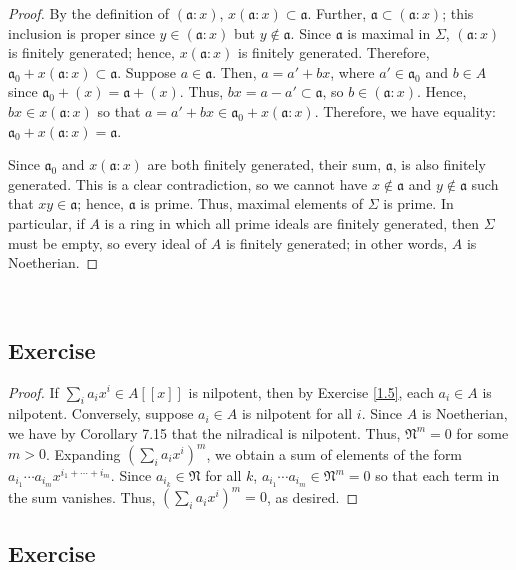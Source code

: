 \begin{proof}
By the definition of $(\mathfrak{a}:x)$, $x(\mathfrak{a}:x) \subset \mathfrak{a}$. Further, $\mathfrak{a} \subset (\mathfrak{a}:x)$; this inclusion is proper since $y \in (\mathfrak{a}:x)$ but
$y \not\in \mathfrak{a}$. Since $\mathfrak{a}$ is maximal in $\Sigma$, $(\mathfrak{a}:x)$ is finitely generated; hence, $x(\mathfrak{a}:x)$ is finitely generated. Therefore, 
$\mathfrak{a}_0 + x(\mathfrak{a}:x) \subset \mathfrak{a}$. Suppose $a \in \mathfrak{a}$. Then, $a = a' + bx$, where $a' \in \mathfrak{a}_0$ and $b \in A$ 
since $\mathfrak{a}_0 + (x) = \mathfrak{a} + (x)$. Thus, $bx = a - a' \subset \mathfrak{a}$, so $b \in (\mathfrak{a}:x)$. Hence, $bx \in x(\mathfrak{a}:x)$ so that 
$a = a' + bx \in \mathfrak{a}_0 + x(\mathfrak{a}:x)$. Therefore, we have equality: $\mathfrak{a}_0 + x(\mathfrak{a}:x) = \mathfrak{a}$. 

Since $\mathfrak{a}_0$ and $x(\mathfrak{a}:x)$ are both finitely generated, their sum, $\mathfrak{a}$, is also finitely generated. This is a clear contradiction,
so we cannot have $x \not\in \mathfrak{a}$ and $y \not\in \mathfrak{a}$ such that $xy \in \mathfrak{a}$; hence, $\mathfrak{a}$ is prime. Thus, maximal elements of $\Sigma$ is prime.
In particular, if $A$ is a ring in which all prime ideals are finitely generated, then $\Sigma$ must be empty, so every ideal of $A$ is finitely generated; in other words, $A$
is Noetherian.
\end{proof}

\

\subsection{Exercise}\label{7.2}

\begin{proof}
If $\sum_i a_i x^i \in A[[x]]$ is nilpotent, then by Exercise \ref{1.5}, each $a_i \in A$ is nilpotent. Conversely, suppose $a_i \in A$ is nilpotent for
all $i$. Since $A$ is Noetherian, we have by Corollary 7.15 that the nilradical is nilpotent. Thus, $\mathfrak{N}^m = 0$ for some $m > 0$. Expanding 
$(\sum_i a_i x^i)^m$, we obtain a sum of elements of the form $a_{i_1} \cdots a_{i_m} x^{i_1 + \cdots + i_m}$. Since $a_{i_k} \in \mathfrak{N}$
for all $k$, $a_{i_1} \cdots a_{i_m} \in \mathfrak{N}^m = 0$ so that each term in the sum vanishes. Thus, $(\sum_i a_i x^i)^m = 0$, as desired.
\end{proof}

\subsection{Exercise}\label{7.3}

